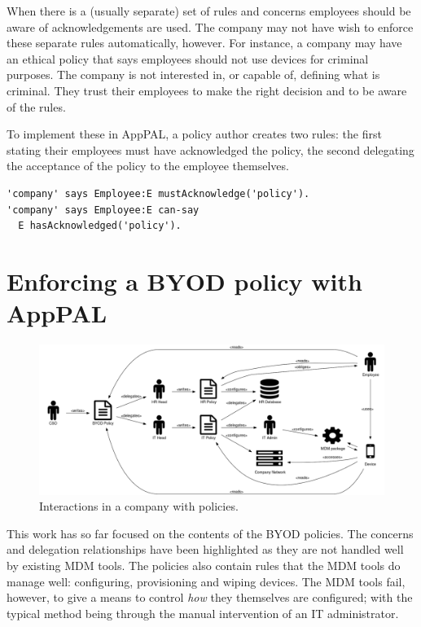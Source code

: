 \documentclass[thesis.tex]{subfiles}
\begin{document}
When there is a (usually separate) set of rules and concerns employees should be aware of acknowledgements are used.
The company may not have wish to enforce these separate rules automatically, however.
For instance, a company may have an ethical policy that says employees should not use devices for criminal purposes.
The company is not interested in, or capable of, defining what is criminal.
They trust their employees to make the right decision and to be aware of the rules.

To implement these in AppPAL, a policy author creates two rules:
  the first stating their employees must have acknowledged the policy,
  the second delegating the acceptance of the policy to the employee themselves.
\begin{lstlisting}
'company' says Employee:E mustAcknowledge('policy').
'company' says Employee:E can-say
  E hasAcknowledged('policy').
\end{lstlisting}


\section{Enforcing a BYOD policy with AppPAL}

\begin{figure}
  \centering
  \includegraphics[width=\textwidth]{figures/mdm-overview.pdf}
  \caption{Interactions in a company with policies.}
  \label{fig:mdm-overview}
\end{figure}

This work has so far focused on the contents of the BYOD policies.  The concerns
and delegation relationships have been highlighted as they are not handled well
by existing \ac{MDM} tools.  The policies also contain rules that the \ac{MDM}
tools do manage well: configuring, provisioning and wiping devices.  The
\ac{MDM} tools fail, however, to give a means to control \emph{how} they
themselves are configured; with the typical method being through the manual
intervention of an IT administrator.
\end{document}
